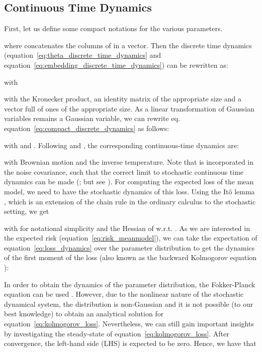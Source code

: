 \documentclass{article} \usepackage{iclr2021_conference,times}
\def\eqref#1{equation~\ref{#1}}
\begin{document}
\subsection{Continuous Time Dynamics} \label{sec:continuous_time_dynamics}
First, let us define some compact notations for the various parameters.

where  concatenates the columns of  in a vector. Then the discrete time dynamics (\eqref{eq:theta_discrete_time_dynamics} and \eqref{eq:embedding_discrete_time_dynamics}) can be rewritten as: 

with 

with  the Kronecker product,  an identity matrix of the appropriate size and  a vector full of ones of the appropriate size. As a linear transformation of Gaussian variables remains a Gaussian variable, we can rewrite eq. \eqref{eq:compact_discrete_dynamics} as follows:

with  and . Following \cite{liu_deep_2019} and \cite{chaudhari_stochastic_2018}, the corresponding continuous-time dynamics are:

with  Brownian motion and  the inverse temperature. 
Note that  is incorporated in the noise covariance, such that the correct limit to stochastic continuous time dynamics can be made (\citealp{liu_deep_2019, chaudhari_stochastic_2018}; but see \citealp{yaida_fluctuation-dissipation_2018}). 
For computing the expected loss  of the mean model, we need to have the stochastic dynamics of this loss. Using the Itô lemma \citep{ito_stochastic_1951, liu_deep_2019}, which is an extension of the chain rule in the ordinary calculus to the stochastic setting, we get

with  for notational simplicity and  the Hessian of  w.r.t. . As we are interested in the expected risk (\eqref{eq:risk_meanmodel}), we can take the expectation of \eqref{eq:loss_dynamics} over the parameter distribution  to get the dynamics of the first moment of the loss (also known as the backward Kolmogorov equation \citep{kolmogorov_analytical_1931}): 

In order to obtain the dynamics of the parameter distribution, the Fokker-Planck equation can be used \citep{jordan_variational_1998}. However, due to the nonlinear nature of the stochastic dynamical system, the distribution is non-Gaussian and it is not possible (to our best knowledge) to obtain an analytical solution for \eqref{eq:kolmogorov_loss}. Nevertheless, we can still gain important insights by investigating the steady-state of \eqref{eq:kolmogorov_loss}. After convergence, the left-hand side (LHS) is expected to be zero. Hence, we have that 
\end{document}
